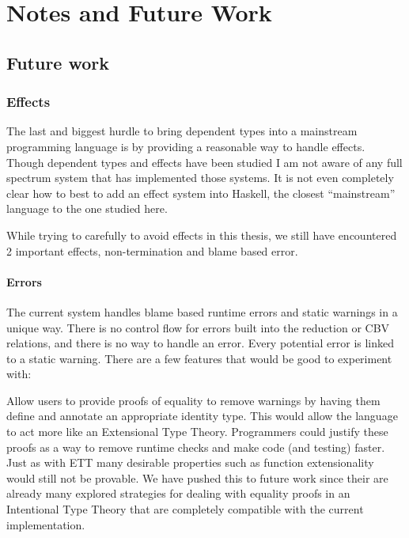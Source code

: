 \chapter{Notes and Future Work}
\label{chapter:Notes}
\thispagestyle{myheadings}



% 
% 

\section{Future work}


\subsection{Effects}

The last and biggest hurdle to bring dependent types into a mainstream programming language is by providing a reasonable way to handle effects.
Though dependent types and effects have been studied I am not aware of any full spectrum system that has implemented those systems.
It is not even completely clear how to best to add an effect system into Haskell, the closest ``mainstream'' language to the one studied here.

While trying to carefully to avoid effects in this thesis, we still have encountered 2 important effects, non-termination and blame based error.

\subsubsection{Errors}

The current system handles blame based runtime errors and static warnings in a unique way.
There is no control flow for errors built into the reduction or CBV relations, and there is no way to handle an error.
Every potential error is linked to a static warning.
There are a few features that would be good to experiment with:

Allow users to provide proofs of equality to remove warnings by having them define and annotate an appropriate identity type.
This would allow the language to act more like an Extensional Type Theory.
Programmers could justify these proofs as a way to remove runtime checks and make code (and testing) faster.
Just as with \ac{ETT} many desirable properties such as function extensionality would still not be provable.
We have pushed this to future work since their are already many explored strategies for dealing with equality proofs in an Intentional Type Theory that are completely compatible with the current implementation.

